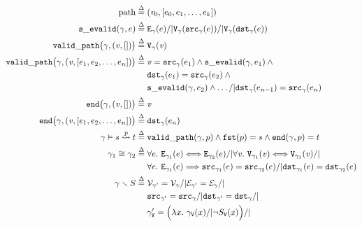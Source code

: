 \documentclass[acmsmall,review,anonymous]{acmart}\settopmatter{printfolios=true,printccs=false,printacmref=false}
\newcommand{\defeq}{\mathbin{\stackrel{\Delta}{=}}}
\begin{document}
 \begin{figure}
	\begin{gather*}
     	\begin{aligned}
    	\mathrm{path} \; \defeq \; &(\m{v}_0, [e_0, e_1, \dots, e_k]) \\ 
    	\mathtt{s\_evalid}(\gamma, e) \; \defeq \; & \mathtt{E}_{\gamma}(e) /| 
    	\mathtt{V}_{\gamma}(\mathtt{src}_{\gamma}(e)) /| 
    	\mathtt{V}_{\gamma}(\mathtt{dst}_{\gamma}(e)) \\
		\mathtt{valid\_path}\big(\gamma, (\m{v},[])\big) \;\defeq \; & \mathtt{V}_{\gamma}(\m{v})\\
		\mathtt{valid\_path}\big(\gamma, (\m{v},[e_1,e_2,\dots,e_n])\big) \; \defeq \; &\m{v}=\mathtt{src}_{\gamma}(e_1) \wedge \mathtt{s\_evalid}(\gamma,e_1) \wedge \null \\
    &\mathtt{dst}_{\gamma}(e_1)=\mathtt{src}_{\gamma}(e_2) \wedge \null\\
    &\mathtt{s\_evalid}(\gamma, e_2) \wedge \dots /| \mathtt{dst}_{\gamma}(e_{n-1})=\mathtt{src}_{\gamma}(e_n) \\ 
        \mathtt{end}\big(\gamma, (\m{v}, [])\big)\;\defeq\;& \m{v}\\
      	\mathtt{end}\big(\gamma, (\m{v},[e_1,e_2,\dots,e_n])\big)\;\defeq\;&
      	\mathtt{dst}_{\gamma}(e_{n})\\
      	\gamma \vDash s \overset{\m{p}}{\leadsto} t \;\defeq\; &
        \mathtt{valid\_path}(\gamma, p)\wedge
        \mathtt{fst}(p)=s \wedge \mathtt{end}(\gamma,p)=t \\
        \gamma_1 \cong \gamma_2 \; \defeq \; & 
        	\forall e.~\mathtt{E}_{\gamma_1}(e) <=> \mathtt{E}_{\gamma_2}(e) /| \forall \m{v}.~\mathtt{V}_{\gamma_1}(\m{v}) <=> \mathtt{V}_{\gamma_1}(\m{v}) /| \null \\
        	&\forall e.~\mathtt{E}_{\gamma_1}(e) ==> \mathtt{src}_{\gamma_1}(e) = \mathtt{src}_{\gamma_2}(e) /| \mathtt{dst}_{\gamma_1}(e) = \mathtt{dst}_{\gamma_2}(e) \\
       	\gamma \smallsetminus S \; \defeq \; 
       	 	&{\mathcal{V}}_{\gamma'} = {\mathcal{V}}_{\gamma} /| 
          {\mathcal{E}}_{\gamma'} = {\mathcal{E}}_{\gamma} /| \null \\
          &{\mathtt{src}}_{\gamma'} = {\mathtt{src}}_{\gamma} /|
          {\mathtt{dst}}_{\gamma'} = {\mathtt{dst}}_{\gamma} /| \null \\
       	 	&\gamma'_{\mathtt{V}} = \Big(\lambda x.~ \gamma_{\mathtt{V}}(x) /| \lnot S_{\mathtt{V}}(x)\Big) /| \null \\ 

\end{aligned}
\end{gather*}
\end{figure}
\end{document}
